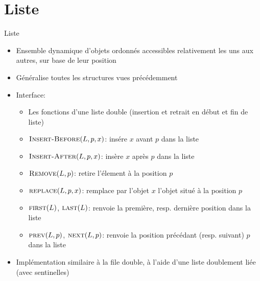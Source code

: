 \section{Liste}

\begin{frame}{Liste}

\begin{itemize}
\item Ensemble dynamique d'objets ordonnés accessibles \alert{relativement}
  les uns aux autres, sur base de leur position
\item Généralise toutes les structures vues précédemment
\item Interface:
\begin{itemize}
\item Les fonctions d'une liste double (insertion et retrait en début et fin de liste)
\item $\textnormal{\scshape Insert-Before}(L,p,x)$: insére $x$ avant $p$ dans la liste
\item $\textnormal{\scshape Insert-After}(L,p,x)$: insère $x$ après $p$ dans la liste
\item $\textnormal{\scshape Remove}(L,p)$: retire l'élement à la position $p$
\item $\textnormal{\scshape replace}(L,p,x)$: remplace par l'objet $x$ l'objet situé à la position $p$
\item $\textnormal{\scshape first}(L)$, $\textnormal{\scshape last}(L)$: renvoie la première, resp. dernière position dans la liste
\item $\textnormal{\scshape prev}(L,p)$, $\textnormal{\scshape next}(L,p)$: renvoie la position précédant (resp. suivant) $p$ dans la liste
\end{itemize}

\bigskip

\item Implémentation similaire à la file double, à l'aide d'une liste doublement liée (avec sentinelles)
\end{itemize}

\end{frame}

